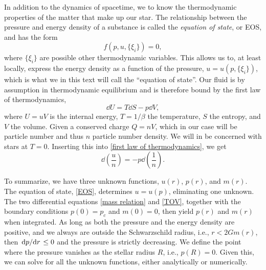 In addition to the dynamics of spacetime, we to know the thermodynamic properties of the matter that make up our star.
The relationship between the pressure and energy density of a substance is called the \emph{equation of state}, or EOS, and has the form
\begin{equation}
    \label{EOS}
    f(p, u, \{\xi_i\}) = 0,
\end{equation}
where $\{\xi_i\}$ are possible other thermodynamic variables.
This allows us to, at least locally, express the energy density as a function of the pressure, $u = u(p, \{\xi_i\})$, which is what we in this text will call the ``equation of state''.
Our fluid is by assumption in thermodynamic equilibrium and is therefore bound by the first law of thermodynamics,
%
\begin{equation}
    \label{first law of thermodynamics}
    \dd U = T \dd S - p \dd V,
\end{equation}
%
where $U = uV$ is the internal energy, $T=1/\beta$ the temperature, $S$ the entropy, and $V$ the volume.
Given a conserved charge $Q = n V$, which in our case will be particle number and thus $n$ particle number density.
We will in be concerned with stars at $T = 0$.
Inserting this into \autoref{first law of thermodynamics}, we get
%
\begin{equation}
    \label{firs law of thermodynamics fluid}
    \dd\left(\frac{u}{n}\right) = - p \dd \left(\frac{1}{n}\right).
\end{equation}

To summarize, we have three unknown functions, $u(r)$, $p(r)$, and $m(r)$.
The equation of state, \autoref{EOS}, determines $u = u(p)$, eliminating one unknown.
The two differential equations \autoref{mass relation} and \autoref{TOV}, together with the boundary conditions $p(0) = p_c$ and $m(0) = 0$, then yield $p(r)$ and $m(r)$ when integrated.
As long as both the pressure and the energy density are positive, and we always are outside the Schwarzschild radius, i.e., $r<2 G m(r)$, then $\odv{p}/{r} \leq 0$ and the pressure is strictly decreasing.
We define the point where the pressure vanishes as the stellar radius $R$, i.e., $p(R) = 0$.
Given this, we can solve for all the unknown functions, either analytically or numerically.


